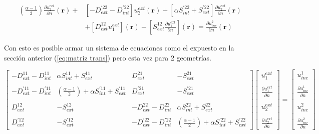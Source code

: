 \documentclass[12pt,letterpaper]{article}
\numberwithin{equation}{section}
\begin{document}
\begin{equation}
\begin{split}
(\frac{\alpha - 1}{2})\frac{\partial u^{ext}_2}{\partial n}(\textbf{r}) + &\left[-D_{ext}^{'22} - D_{int}^{'22}\right] u^{ext}_2(\textbf{r}) + \left[\alpha S_{int}^{'22} + S_{ext}^{'22}\right]\frac{\partial u^{ext}_2}{\partial n}(\textbf{r})\\
&+ \left[D_{ext}^{12} u^{ext}_1\right](\textbf{r}) - \left[S_{ext}^{12} \frac{\partial u^{ext}_1}{\partial n}\right](\textbf{r}) = \frac{\partial u_{inc}^2}{\partial n}(\textbf{r}) 
\end{split}
\label{eq: multi_trans_deriv_2}		
\end{equation}

Con esto es posible armar un sistema de ecuaciones como el expuesto en la sección anterior (\ref{eq:matriz trans}) pero esta vez para 2 geometrías.

\begin{equation} 
\begin{bmatrix}
-D_{ext}^{11} - D_{int}^{11} & \alpha S_{int}^{11} + S_{ext}^{11} & D_{ext}^{21} & -S_{ext}^{21} \\
\\
-D_{ext}^{'11} - D_{int}^{'11} & (\frac{\alpha - 1}{2})+\alpha S_{int}^{'11} + S_{ext}^{'11} & D_{ext}^{'21} & -S_{ext}^{'21}\\
\\
D_{ext}^{12} & -S_{ext}^{12} & -D_{ext}^{22} - D_{int}^{22} & \alpha S_{int}^{22} + S_{ext}^{22}\\
\\
D_{ext}^{'12} & -S_{ext}^{'12} & -D_{ext}^{'22} - D_{int}^{'22} & (\frac{\alpha - 1}{2})+\alpha S_{int}^{'22} + S_{ext}^{'22}
\end{bmatrix}
\begin{bmatrix}
u^{ext}_1\\
\\
\frac{\partial u^{ext}_1}{\partial n}\\
\\
u^{ext}_2\\
\\
\frac{\partial u^{ext}_2}{\partial n}
\end{bmatrix}
=
\begin{bmatrix}
u_{inc}^1\\
\\
\frac{\partial u_{inc}^1}{\partial n}\\
\\
u_{inc}^2\\
\\
\frac{\partial u_{inc}^2}{\partial n}
\end{bmatrix}
\label{eq:multi2_matriz ext}		 
\end{equation} 
\end{document}
